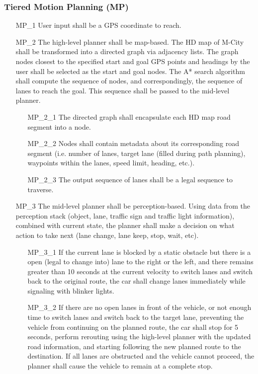 \subsubsection{Tiered Motion Planning (MP)}
    \begin{itemize}
        \item[MP\_1] User input shall be a GPS coordinate to reach.
        \item[MP\_2] The high-level planner shall be map-based. The HD map of M-City shall be transformed into a directed graph via adjacency lists. The graph nodes closest to the specified start and goal GPS points and headings by the user shall be selected as the start and goal nodes. The A* search algorithm shall compute the sequence of nodes, and correspondingly, the sequence of lanes to reach the goal. This sequence shall be passed to the mid-level planner.
        \begin{itemize}
            \item[MP\_2\_1] The directed graph shall encapsulate each HD map road segment into a node.
            \item[MP\_2\_2] Nodes shall contain metadata about its corresponding road segment (i.e. number of lanes, target lane (filled during path planning), waypoints within the lanes, speed limit, heading, etc.).
            \item[MP\_2\_3] The output sequence of lanes shall be a legal sequence to traverse.
        \end{itemize}
        \item[MP\_3] The mid-level planner shall be perception-based. Using data from the perception stack (object, lane, traffic sign and traffic light information), combined with current state, the planner shall make a decision on what action to take next (lane change, lane keep, stop, wait, etc).
        \begin{itemize}
            \item[MP\_3\_1] If the current lane is blocked by a static obstacle but there is a open (legal to change into) lane to the right or the left, and there remains greater than 10 seconds at the current velocity to switch lanes and switch back to the original route, the car shall change lanes immediately while signaling with blinker lights.
            \item[MP\_3\_2] If there are no open lanes in front of the vehicle, or not enough time to switch lanes and switch back to the target lane, preventing the vehicle from continuing on the planned route, the car shall stop for 5 seconds, perform rerouting using the high-level planner with the updated road information, and starting following the new planned route to the destination. If all lanes are obstructed and the vehicle cannot proceed, the planner shall cause the vehicle to remain at a complete stop.

\end{itemize}
\end{itemize}
